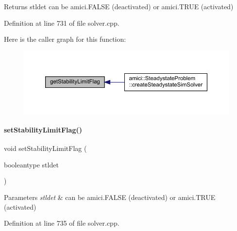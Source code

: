 \begin{DoxyReturn}{Returns}
stldet can be amici.\+F\+A\+L\+SE (deactivated) or amici.\+T\+R\+UE (activated) 
\end{DoxyReturn}


Definition at line 731 of file solver.\+cpp.

Here is the caller graph for this function\+:
\nopagebreak
\begin{figure}[H]
\begin{center}
\leavevmode
\includegraphics[width=350pt]{classamici_1_1_solver_ae1e9c3c5e59413ae25fb67c29983e3f3_icgraph}
\end{center}
\end{figure}
\mbox{\label{classamici_1_1_solver_a618a94f1d84f9c71230d476f9a0205ce}} 
\paragraph{\texorpdfstring{set\+Stability\+Limit\+Flag()}{setStabilityLimitFlag()}}
{\footnotesize\ttfamily void set\+Stability\+Limit\+Flag (\begin{DoxyParamCaption}\item[{booleantype}]{stldet }\end{DoxyParamCaption})}


\begin{DoxyParams}{Parameters}
{\em stldet} & can be amici.\+F\+A\+L\+SE (deactivated) or amici.\+T\+R\+UE (activated) \\
\hline
\end{DoxyParams}


Definition at line 735 of file solver.\+cpp.

